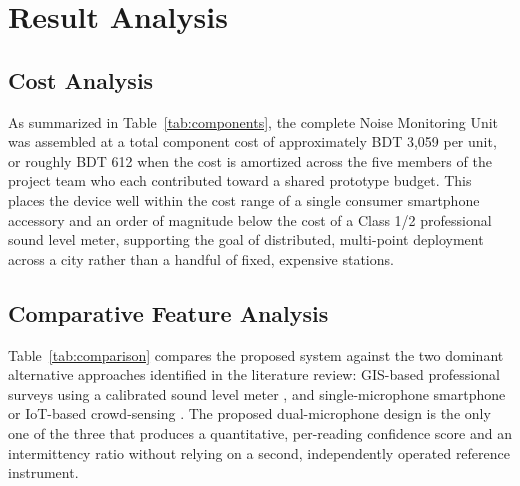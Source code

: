 \documentclass[conference]{IEEEtran}
\begin{document}
\section{Result Analysis}

\subsection{Cost Analysis}
As summarized in Table~\ref{tab:components}, the complete Noise Monitoring Unit was assembled at a total component cost of approximately BDT 3,059 per unit, or roughly BDT 612 when the cost is amortized across the five members of the project team who each contributed toward a shared prototype budget. This places the device well within the cost range of a single consumer smartphone accessory and an order of magnitude below the cost of a Class 1/2 professional sound level meter, supporting the goal of distributed, multi-point deployment across a city rather than a handful of fixed, expensive stations.

\subsection{Comparative Feature Analysis}
Table~\ref{tab:comparison} compares the proposed system against the two dominant alternative approaches identified in the literature review: GIS-based professional surveys using a calibrated sound level meter \cite{b2}\cite{b4}, and single-microphone smartphone or IoT-based crowd-sensing \cite{b5}\cite{b8}\cite{b9}. The proposed dual-microphone design is the only one of the three that produces a quantitative, per-reading confidence score and an intermittency ratio without relying on a second, independently operated reference instrument.
\end{document}
